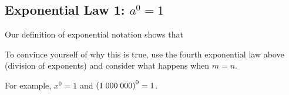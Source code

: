             \subsection{ Exponential Law 1: ${a}^{0}=1$}
            \nopagebreak
        \label{m38359*id63512}Our definition of exponential notation shows that\par 
        \label{m38359*uid5}\nopagebreak\noindent{}
        \label{m38359*eip-662}To convince yourself of why this is true, use the fourth exponential law above (division of exponents) and consider what happens when \begin{math}m=n\end{math}.\par \label{m38359*id63571}For example, \begin{math}{x}^{0}=1\end{math} and \begin{math}{\left(1\phantom{\rule{0.277778em}{0ex}}000\phantom{\rule{0.277778em}{0ex}}000\right)}^{0}=1\end{math}.\par 
\label{m38359*secfhsst!!!underscore!!!id339}
